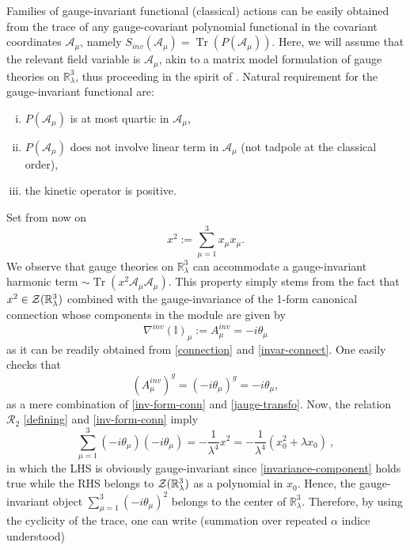 \documentclass[a4paper,11pt,twoside]{article}
\numberwithin{equation}{section}
\newcommand\bbone{{ \mathbb{I}}}
\DeclareMathOperator{\tr}{Tr}
\theoremstyle{nonumberplain}
\newcounter{and}
\begin{document}
Families of gauge-invariant functional (classical) actions can be easily obtained from the trace of any gauge-covariant polynomial functional in the covariant coordinates $\mathcal{A}_\mu$, namely $S_{inv}(\mathcal{A}_\mu)=\tr\left(P(\mathcal{A}_\mu)\right)$. Here, we will assume that the relevant field variable is $\mathcal{A}_\mu$, akin to a matrix model formulation of gauge theories on $\mathbb{R}^3_\lambda$, thus proceeding in the spirit of \cite{MVW13}. Natural requirement for the gauge-invariant functional are:
\begin{enumerate}[i)]
\item $P(\mathcal{A}_\mu)$ is at most quartic in $\mathcal{A}_\mu$,
\item $P(\mathcal{A}_\mu)$ does not involve linear term in $\mathcal{A}_\mu$ (not tadpole at the classical order),
\item the kinetic operator is positive.
\end{enumerate}
Set from now on 
\begin{equation*}
x^2 := \sum_{\mu=1}^3x_\mu x_\mu. 
\end{equation*}
We observe that gauge theories on $\mathbb{R}^3_\lambda$ can accommodate a 
gauge-invariant harmonic term $\sim\tr(x^2\mathcal{A}_\mu \mathcal{A}_\mu)$. This property simply stems from the fact that $x^2\in{\cal{Z}}(\mathbb{R}^3_\lambda)$ combined with the gauge-invariance of the 1-form canonical connection whose components in the module are given by 
\begin{equation}
\nabla^{inv}(\bbone)_\mu:=A^{inv}_\mu=-i\theta_\mu\label{component-invar-connect}
\end{equation}
as it can be readily obtained from \eqref{connection} and \eqref{invar-connect}. One easily checks that 
\begin{equation}
(A^{inv}_\mu)^g=(-i\theta_\mu)^g=-i\theta_\mu\label{invariance-component},
\end{equation}
as a mere combination of \eqref{inv-form-conn} and \eqref{jauge-transfo}. Now, the relation $\mathcal{R}_2$ \eqref{defining} and \eqref{inv-form-conn} imply
\begin{equation}
\sum_{\mu=1}^3(-i\theta_\mu)(-i\theta_\mu ) = -\frac{1}{\lambda^4}x^2 = -\frac{1}{\lambda^4}(x_0^2+\lambda x_0) \ , \label{harmonic-operator}
\end{equation}
in which the LHS is obviously gauge-invariant since \eqref{invariance-component} holds true while the RHS belongs to ${\cal{Z}}(\mathbb{R}^3_\lambda)$ as a polynomial in $x_0$. Hence, the gauge-invariant object $\sum_{\mu=1}^3(-i\theta_\mu)^2$ belongs to the center of $\mathbb{R}^3_\lambda$. Therefore, by using the cyclicity of the trace, one can write (summation over repeated $\alpha$ indice understood) %
\end{document}
